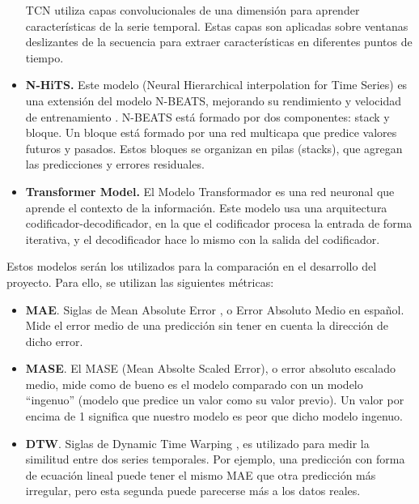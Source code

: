 \begin{itemize}
        TCN utiliza capas convolucionales de una dimensión para aprender características de la serie temporal. Estas 
        capas son aplicadas sobre ventanas deslizantes de la secuencia para extraer características en diferentes puntos 
        de tiempo.
    \item \textbf{N-HiTS.} Este modelo (Neural Hierarchical interpolation for Time Series) es una extensión del modelo 
        N-BEATS, mejorando su rendimiento y velocidad de entrenamiento \cite{DBLP:journals/corr/abs-2201-12886}. N-BEATS \cite{Oreshkin2020N-BEATS:}
        está formado por dos componentes: stack y bloque. Un bloque está formado por una red multicapa que predice 
        valores futuros y pasados. Estos bloques se organizan en pilas (stacks), que agregan las predicciones y errores 
        residuales. 
    \item \textbf{Transformer Model.} El Modelo Transformador \cite{DBLP:journals/corr/VaswaniSPUJGKP17} es una red 
        neuronal que aprende el contexto de la información. Este modelo usa una arquitectura codificador-decodificador,
        en la que el codificador procesa la entrada de forma iterativa, y el decodificador hace lo mismo con la salida del 
        codificador.
    \end{itemize}

Estos modelos serán los utilizados para la comparación en el desarrollo del proyecto. Para ello, se utilizan 
las siguientes métricas:
\begin{itemize}
    \item \textbf{MAE}. Siglas de Mean Absolute Error \cite{Botchkarev_2019}, o Error Absoluto Medio en español. Mide el error medio
        de una predicción sin tener en cuenta la dirección de dicho error.
    \item \textbf{MASE}. El MASE \cite{hyndman2006another} (Mean Absolte Scaled Error), o error absoluto escalado medio, mide como de bueno es 
        el modelo comparado con un modelo ``ingenuo'' (modelo que predice un valor como su valor previo). Un valor 
        por encima de 1 significa que nuestro modelo es peor que dicho modelo ingenuo.
    \item \textbf{DTW}. Siglas de Dynamic Time Warping \cite{Müller2007}, es utilizado para medir la similitud entre dos series temporales. Por ejemplo, una predicción 
        con forma de ecuación lineal puede tener el mismo MAE que otra predicción más irregular, pero esta segunda 
        puede parecerse más a los datos reales.
\end{itemize}